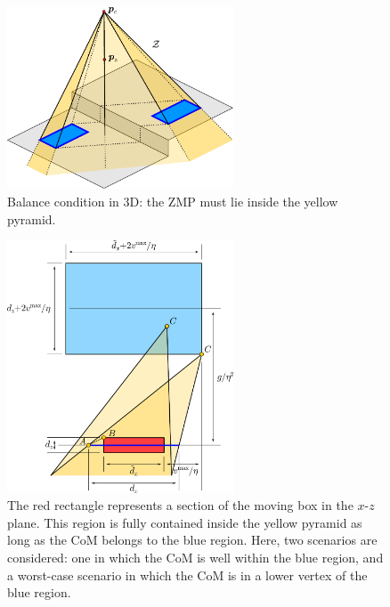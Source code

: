 


\begin{figure}
    \centering
    \includegraphics[width=0.6\textwidth]{figures/balance3d.pdf}
    \caption{Balance condition in 3D: the ZMP must lie inside the yellow pyramid.}
    \label{fig:WoS:balance3d}
\end{figure}

\begin{figure}
    \centering
    \includegraphics[width=0.6\textwidth]{figures/conservative.pdf}
    \caption{The red rectangle represents a section of the moving box in the $x$-$z$ plane. This region is fully contained inside the yellow pyramid as long as the CoM belongs to the blue region. Here, two scenarios are considered: one in which the CoM is well within the blue region, and a worst-case scenario in which the CoM is in a lower vertex of the blue region.}
    \label{fig:WoS:conservative}
\end{figure}

